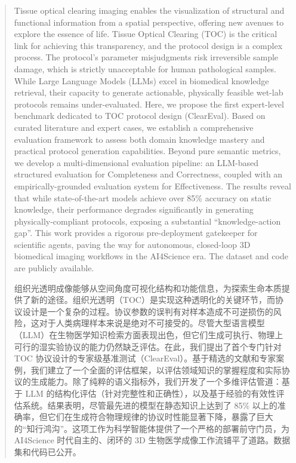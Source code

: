 \documentclass[runningheads]{llncs}
\begin{document}
\begin{abstract}
Tissue optical clearing imaging enables the visualization of structural and functional information from a spatial perspective, offering new avenues to explore the essence of life. Tissue Optical Clearing (TOC) is the critical link for achieving this transparency, and the protocol design is a complex process. The protocol’s parameter misjudgments risk irreversible sample damage, which is strictly unacceptable for human pathological samples. While Large Language Models (LLMs) excel in biomedical knowledge retrieval, their capacity to generate actionable, physically feasible wet-lab protocols remains under-evaluated. Here, we propose the first expert-level benchmark dedicated to TOC protocol design (ClearEval). Based on curated literature and expert cases, we establish a comprehensive evaluation framework to assess both domain knowledge mastery and practical protocol generation capabilities. Beyond pure semantic metrics, we develop a multi-dimensional evaluation pipeline: an LLM-based structured evaluation for Completeness and Correctness, coupled with an empirically-grounded evaluation system for Effectiveness. The results reveal that while state-of-the-art models achieve over 85\% accuracy on static knowledge, their performance degrades significantly in generating physically-compliant protocols, exposing a substantial ``knowledge-action gap''. This work provides a rigorous pre-deployment gatekeeper for scientific agents, paving the way for autonomous, closed-loop 3D biomedical imaging workflows in the AI4Science era. The dataset and code are publicly available.

组织光透明成像能够从空间角度可视化结构和功能信息，为探索生命本质提供了新的途径。组织光透明（TOC）是实现这种透明化的关键环节，而协议设计是一个复杂的过程。协议参数的误判有对样本造成不可逆损伤的风险，这对于人类病理样本来说是绝对不可接受的。尽管大型语言模型（LLM）在生物医学知识检索方面表现出色，但它们生成可执行、物理上可行的湿实验协议的能力仍然缺乏评估。在此，我们提出了首个专门针对 TOC 协议设计的专家级基准测试（ClearEval）。基于精选的文献和专家案例，我们建立了一个全面的评估框架，以评估领域知识的掌握程度和实际协议的生成能力。除了纯粹的语义指标外，我们开发了一个多维评估管道：基于 LLM 的结构化评估（针对完整性和正确性），以及基于经验的有效性评估系统。结果表明，尽管最先进的模型在静态知识上达到了 85\% 以上的准确率，但它们在生成符合物理规律的协议时性能显著下降，暴露了巨大的“知行鸿沟”。这项工作为科学智能体提供了一个严格的部署前守门员，为 AI4Science 时代自主的、闭环的 3D 生物医学成像工作流铺平了道路。数据集和代码已公开。

\end{abstract}
\end{document}
